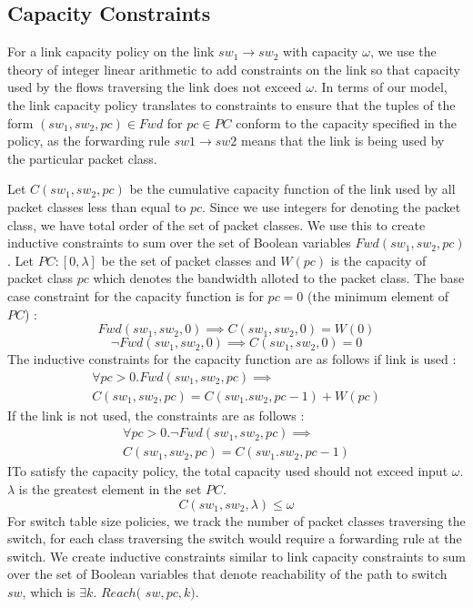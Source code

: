 \subsection{Capacity Constraints}
For a link capacity policy on the link $sw_1 \rightarrow sw_2$ with capacity $\omega$, we use the theory of integer linear arithmetic to add constraints on the link so that capacity used by the flows traversing the link does not exceed $\omega$. In terms of our model, the link capacity policy translates to constraints to ensure that the tuples of the form $(sw_1, sw_2, pc) \in Fwd$ for $pc \in PC$ conform to the capacity specified in the policy, as the forwarding rule $sw1 \rightarrow sw2$ means that the link is being used by the particular packet class.
 
Let $C(sw_1,sw_2,pc)$ be the cumulative capacity function of the link used by all packet classes less than equal to $pc$. Since we use integers for denoting the packet class, we have total order of the set of packet classes. We use this to create inductive constraints to sum over the set of Boolean variables $Fwd(sw_1, sw_2,pc)$. Let $PC : [0, \lambda]$ be the set of packet classes and $W(pc)$ is the capacity of packet class $pc$ which denotes the bandwidth alloted to the packet class. 
The base case constraint for the capacity function is for $pc = 0$ (the minimum element of $PC$) :
\begin{equation}
	Fwd(sw_1, sw_2, 0) \implies C(sw_1, sw_2, 0) = W(0)
\end{equation}
\begin{equation}
	\neg Fwd(sw_1, sw_2, 0) \implies C(sw_1, sw_2, 0) = 0
\end{equation} 
The inductive constraints for the capacity function are as follows if link is used : 
\begin{multline}
	\forall pc > 0. Fwd(sw_1,sw_2,pc) \implies \\ C(sw_1, sw_2, pc) =  C(sw_1. sw_2, pc - 1) + W(pc)
\end{multline}
If the link is not used, the constraints are as follows : 
\begin{multline}
\forall pc > 0. \neg Fwd(sw_1,sw_2,pc) \implies \\ C(sw_1, sw_2, pc) =  C(sw_1. sw_2, pc - 1)
\end{multline}
ITo satisfy the capacity policy, the total capacity used should not exceed input $\omega$. $\lambda$ is the greatest element in the set $PC$. 
\begin{equation}
	C(sw_1, sw_2, \lambda) \leq \omega	
\end{equation} 
For switch table size policies, we track the number of packet classes traversing the switch, for each class traversing the switch would require a forwarding rule at the switch. We create inductive constraints similar to link capacity constraints to sum over the set of Boolean variables that denote reachability of the path to switch $sw$, which is $\exists k$. $Reach($ $sw,pc,k)$.